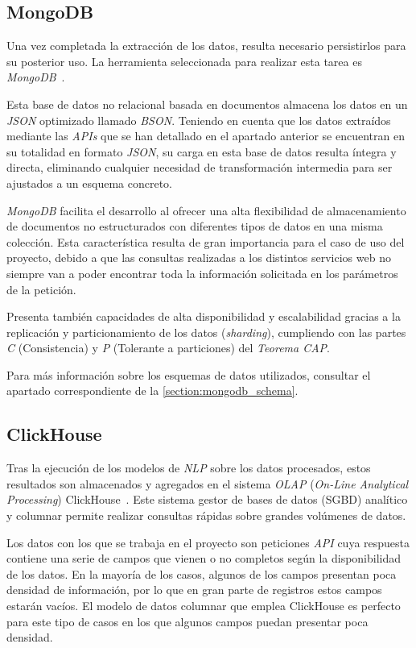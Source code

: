\subsection{MongoDB}

Una vez completada la extracción de los datos, resulta necesario persistirlos para su posterior uso. La herramienta seleccionada para realizar esta tarea es \textit{MongoDB}~\cite{mongodbArchitecture}.

Esta base de datos no relacional basada en documentos almacena los datos en un \textit{JSON} optimizado llamado \textit{BSON}. Teniendo en cuenta que los datos extraídos mediante las \textit{APIs} que se han detallado en el apartado anterior se encuentran en su totalidad en formato \textit{JSON}, su carga en esta base de datos resulta íntegra y directa, eliminando cualquier necesidad de transformación intermedia para ser ajustados a un esquema concreto.

\textit{MongoDB} facilita el desarrollo al ofrecer una alta flexibilidad de almacenamiento de documentos no estructurados con diferentes tipos de datos en una misma colección. Esta característica resulta de gran importancia para el caso de uso del proyecto, debido a que las consultas realizadas a los distintos servicios web no siempre van a poder encontrar toda la información solicitada en los parámetros de la petición.

Presenta también capacidades de alta disponibilidad y escalabilidad gracias a la replicación y particionamiento de los datos (\textit{sharding}), cumpliendo con las partes \textit{C} (Consistencia) y \textit{P} (Tolerante a particiones) del \textit{Teorema CAP}.

Para más información sobre los esquemas de datos utilizados, consultar el apartado correspondiente de la \autoref{section:mongodb_schema}.

\subsection{ClickHouse}

Tras la ejecución de los modelos de \textit{NLP} sobre los datos procesados, estos resultados son almacenados y agregados en el sistema \textit{OLAP} (\textit{On-Line Analytical Processing}) ClickHouse~\cite{clickhouseFeatures}. Este sistema gestor de bases de datos (SGBD) analítico y columnar permite realizar consultas rápidas sobre grandes volúmenes de datos.

Los datos con los que se trabaja en el proyecto son peticiones \textit{API} cuya respuesta contiene una serie de campos que vienen o no completos según la disponibilidad de los datos. En la mayoría de los casos, algunos de los campos presentan poca densidad de información, por lo que en gran parte de registros estos campos estarán vacíos. El modelo de datos columnar que emplea ClickHouse es perfecto para este tipo de casos en los que algunos campos puedan presentar poca densidad.

